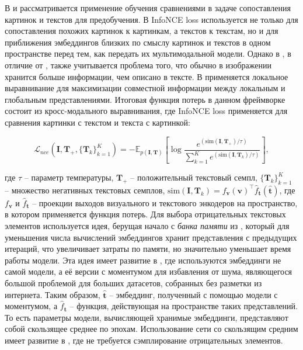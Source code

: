 \documentclass[a4paper, 14pt]{article}
\begin{document}
В \citep{ALBEF} и \citep{TCL} рассматривается применение обучения сравнениями в задаче сопоставления картинок и текстов для предобучения. В \citep{ALBEF} InfoNCE loss используется не только для сопоставления похожих картинок к картинкам, а текстов к текстам, но и для приближения эмбеддингов близких по смыслу картинок и текстов в одном пространстве перед тем, как передать их мультимодальной модели. Однако в \citep{TCL}, в отличие от \citep{ALBEF}, также учитывается проблема того, что обычно в изображении хранится больше информации, чем описано в тексте. В \citep{TCL} применяется локальное выравнивание для максимизации совместной информации между локальным и глобальным представлениями. Итоговая функция потерь в данном фреймворке состоит из кросс-модального выравнивания, где InfoNCE loss применяется для сравнения картинки с текстом и текста с картинкой:

\begin{equation}
    \mathcal{L}_{nce}(\mathbf{I}, \mathbf{T}_+, \{\mathbf{T}_k\}_{k=1}^K) = - \mathbb{E}_{p(\mathbf{I}, \mathbf{T})}\left[\log\frac{e^{(\text{sim}(\mathbf{I}, \mathbf{T}_+)/\tau)}}{\sum_{k=1}^Ke^{(\text{sim}(\mathbf{I}, \mathbf{T}_k)/\tau)}}\right],
\end{equation}

\noindent где $\tau$ -- параметр температуры, $\mathbf{T}_+$ -- положительный текстовый семпл, $\{\mathbf{T}_k\}_{k=1}^K$ -- множество негативных текстовых семплов, $\text{sim}(\mathbf{I}, \mathbf{T}_k) = f_\mathbf{v}(\mathbf{v})^\top \hat{f}_\mathbf{t}(\hat{\mathbf{t}})$, где $f_\mathbf{v}$ и $\hat{f}_\mathbf{t}$ -- проекции выходов визуального и текстового энкодеров на пространство, в котором применяется функция потерь. Для выбора отрицательных текстовых элементов используется идея, берущая начало с \textit{банка памяти} из \citep{MemoryBank}, который для уменьшения числа вычислений эмбеддингов хранит представления с предыдущих итераций, что увеличивает затраты по памяти, но значительно уменьшает время работы модели. Эта идея имеет развитие в \citep{he2019moco}, где используются эмбеддинги не самой модели, а её версии с моментумом для избавления от шума, являющегося большой проблемой для больших датасетов, собранных без разметки из интернета. Таким образом, $\hat{\mathbf{t}}$ -- эмбеддинг, полученный с помощью модели с моментумом, а $\hat{f}_\mathbf{t}$ -- функция, действующая на пространстве таких представлений. То есть параметры модели, вычисляющей хранимые эмбеддинги, представляют собой скользящее среднее по эпохам. Использование сети со скользящим средним имеет развитие в \citep{grill2020bootstrap}, где не требуется сэмплирование отрицательных элементов.
\end{document}
